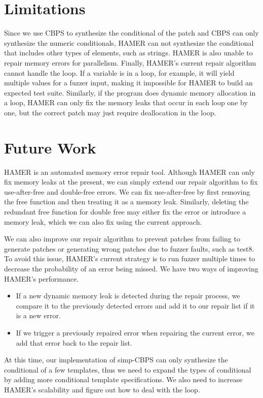 \documentclass[a4paper,11pt,oneside,openany]{book}
\begin{document}
\section{Limitations}
Since we use CBPS to synthesize the conditional of the patch and CBPS can only synthesize the numeric conditionals, HAMER can not synthesize the conditional that includes other types of elements, such as strings. HAMER is also unable to repair memory errors for parallelism. Finally, HAMER's current repair algorithm cannot handle the loop. If a variable is in a loop, for example, it will yield multiple values for a fuzzer input, making it impossible for HAMER to build an expected test suite. Similarly, if the program does dynamic memory allocation in a loop, HAMER can only fix the memory leaks that occur in each loop one by one, but the correct patch may just require deallocation in the loop.
\section{Future Work}
\label{futurework}
HAMER is an automated memory error repair tool. Although HAMER can only fix memory leaks at the present, we can simply extend our repair algorithm to fix use-after-free and double-free errors. We can fix use-after-free by first removing the free function and then treating it as a memory leak. Similarly, deleting the redundant free function for double free may either fix the error or introduce a memory leak, which we can also fix using the current approach.

We can also improve our repair algorithm to prevent patches from failing to generate patches or generating wrong patches due to fuzzer faults, such as test8. To avoid this issue, HAMER's current strategy is to run fuzzer multiple times to decrease the probability of an error being missed. We have two ways of improving HAMER's performance.
\begin{itemize}
\item If a new dynamic memory leak is detected during the repair process, we compare it to the previously detected errors and add it to our repair list if it is a new error.
\item If we trigger a previously repaired error when repairing the current error, we add that error back to the repair list.
\end{itemize}

At this time, our implementation of simp-CBPS can only synthesize the conditional of a few templates, thus we need to expand the types of conditional by adding more conditional template specifications. We also need to increase HAMER's scalability and figure out how to deal with the loop.











\end{document}
